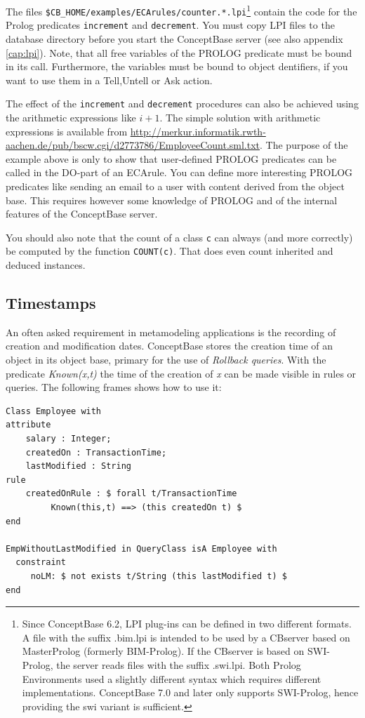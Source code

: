 The files \verb+$CB_HOME/examples/ECArules/counter.*.lpi+\footnote{Since ConceptBase 6.2,
LPI plug-ins can be defined in two different formats. A file with the suffix
.bim.lpi is intended to be used by a CBserver based on MasterProlog (formerly BIM-Prolog).
If the CBserver is based on SWI-Prolog, the server reads files with the suffix
.swi.lpi. Both Prolog Environments used a slightly different syntax which requires different
implementations. ConceptBase 7.0 and later only supports SWI-Prolog,
hence providing the swi variant is sufficient.}
contain the code for the Prolog predicates {\tt increment} and {\tt decrement}.
You must copy LPI files to the database directory before you start
the ConceptBase server (see also appendix \ref{cap:lpi}). Note, that all free variables
of the PROLOG predicate must be bound in its call. Furthermore,
the variables must be bound to object dentifiers, if you
want to use them in a Tell,Untell or Ask action.

The effect of the {\tt increment} and {\tt decrement} procedures
can also be achieved using the arithmetic expressions like $i+1$.
The simple solution with arithmetic expressions is available from
\url{http://merkur.informatik.rwth-aachen.de/pub/bscw.cgi/d2773786/EmployeeCount.sml.txt}.
The purpose of the example above is only to show that
user-defined PROLOG predicates can be called in the DO-part of an ECArule.
You can define more interesting PROLOG predicates like sending an email
to a user with content derived from the object base. This requires however
some knowledge of PROLOG and of the internal features of the ConceptBase
server.

You should also note that the count of a class {\tt c} can always (and more correctly) be computed
by the function {\tt COUNT(c)}. That does even count inherited and deduced instances.


\subsection{Timestamps}

An often asked requirement in metamodeling applications is the
recording of creation and modification dates. ConceptBase stores
the creation time of an object in its object base, primary for
the use of {\em Rollback queries}. With the predicate {\em Known(x,t)}
the time of the creation of {\em x} can be made visible in rules
or queries. The following frames shows how to use it:

{\small
\begin{verbatim}
Class Employee with
attribute
    salary : Integer;
    createdOn : TransactionTime;
    lastModified : String
rule
    createdOnRule : $ forall t/TransactionTime
         Known(this,t) ==> (this createdOn t) $
end

EmpWithoutLastModified in QueryClass isA Employee with
  constraint
     noLM: $ not exists t/String (this lastModified t) $
end
\end{verbatim}
}

